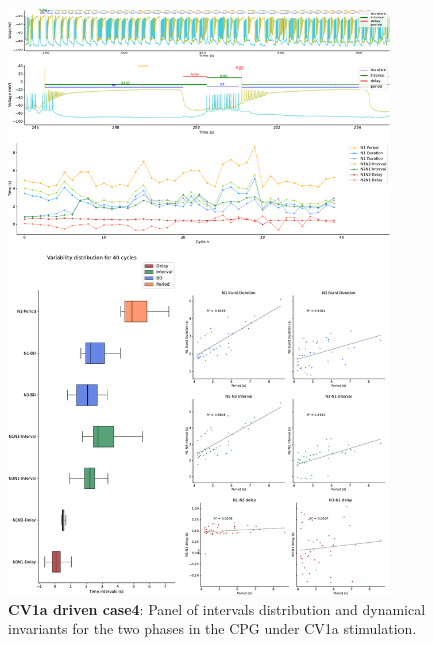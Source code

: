 \begin{figure}[htbp]
	\centering
	\includegraphics[width=0.9\textwidth]{./invariants/data/SUSSEX/CV1a_driven4/images/2phases/panel_with_intervals.pdf}
	\caption{\textbf{CV1a driven case4}: Panel of intervals distribution and dynamical invariants for the two phases in the CPG under CV1a stimulation.}
	\label{fig:cv1a 4 2phases}
\end{figure}

